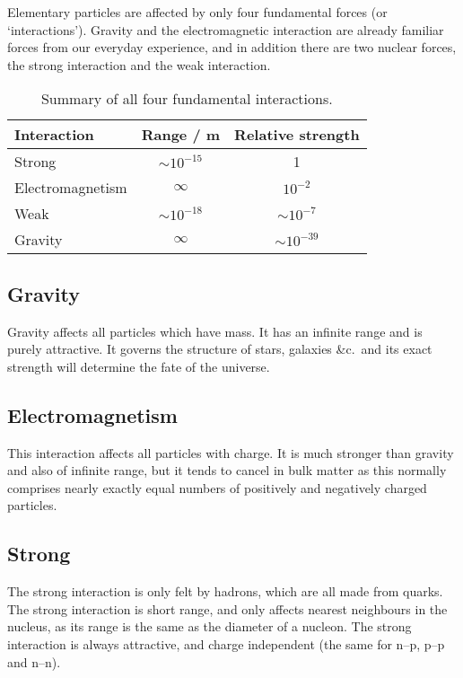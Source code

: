 
Elementary particles are affected by only four fundamental forces (or `interactions').  Gravity and the electromagnetic interaction are already familiar forces from our everyday experience, and in addition there are two nuclear forces, the strong interaction and the weak interaction.

\begin{table}
  \centering
  \small\selectfont
  \begin{tabular}{lcc}
    \toprule
    Interaction & Range / m & Relative strength\\
    \midrule
    Strong & $\sim 10^{-15}$ & 1\\
    Electromagnetism & $\infty$ & $10^{-2}$\\
    Weak & $\sim 10^{-18}$ & $\sim 10^{-7}$\\
    Gravity & $\infty$ & $\sim 10^{-39}$\\
    \bottomrule
  \end{tabular}
  \caption{Summary of all four fundamental interactions.}
\end{table}

\subsection{Gravity}
Gravity affects all particles which have mass.  It has an infinite range and is purely attractive.  It governs the structure of stars, galaxies \&{}c.\ and its exact strength will determine the fate of the universe.

\subsection{Electromagnetism}
This interaction affects all particles with charge.  It is much stronger than gravity and also of infinite range, but it tends to cancel in bulk matter as this normally comprises nearly exactly equal numbers of positively and negatively charged particles.

\subsection{Strong}

The strong interaction is only felt by hadrons, which are all made from quarks.  The strong interaction is short range, and only affects nearest neighbours in the nucleus, as its range is the same as the diameter of a nucleon.  The strong interaction is always attractive, and charge independent (the same for n--p, p--p and n--n).

